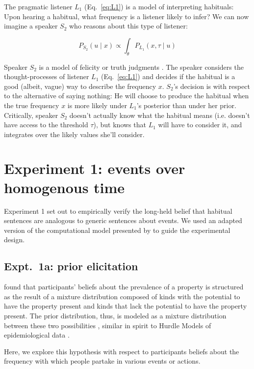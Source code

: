 \documentclass[10pt,letterpaper]{article}
\begin{document}
The pragmatic listener $L_1$ (Eq.~\ref{eq:L1}) is a model of interpreting habituals: Upon hearing a habitual, what frequency is a listener likely to infer?
We can now imagine a speaker $S_2$ who reasons about this type of listener: 

\begin{equation} 
P_{S_{2}}(u \mid x) \propto  \int_{\theta} P_{L_{1}}(x , \tau \mid u)
\label{eq:S2}
\end{equation}

Speaker $S_2$ is a model of felicity or truth judgments \cite{Degen2014, TesslerUnderReview}.
The speaker considers the thought-processes of listener $L_1$ (Eq.~\ref{eq:L1}) and decides if the habitual is a good (albeit, vague) way to describe the frequency $x$. 
$S_2$'s decision is with respect to the alternative of saying nothing: He will choose to produce the habitual when the true frequency $x$ is more likely under $L_1$'s posterior than under her prior. 
Critically, speaker $S_{2}$ doesn't actually know what the habitual means (i.e. doesn't have access to the threshold $\tau$), but knows that $L_{1}$ will have to consider it, and integrates over the likely values she'll consider.


\section{Experiment 1: events over homogenous time}

Experiment 1 set out to empirically verify the long-held belief that habitual sentences are analogous to generic sentences about events. 
We used an adapted version of the computational model presented by  to guide the experimental design.

\subsection{Expt.~1a: prior elicitation}

 found that participants' beliefs about the prevalence of a property is structured as the result of a mixture distribution composed of kinds with the potential to have the property present and kinds that lack the potential to have the property present.
The prior distribution, thus, is modeled as a mixture distribution between these two possibilities \cite{Griffiths2005}, similar in spirit to Hurdle Models of epidemiological data \cite{hurdleModels}.

Here, we explore this hypothesis with respect to participants beliefs about the frequency with which people partake in various events or actions.
\end{document}
